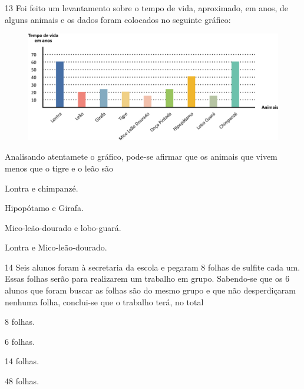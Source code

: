 \pagebreak
\num{13} Foi feito um levantamento sobre o tempo de vida, aproximado, em anos, de alguns animais e os dados foram colocados no seguinte gráfico:

\begin{figure}[htpb!]
\centering
\includegraphics[width=\textwidth]{./media/image112.png}
\end{figure}

Analisando atentamete o gráfico, pode-se afirmar que os animais que vivem menos que o tigre e o leão são

\begin{multicols}{2}[\setlength{\columnsep}{-1cm}]
\begin{escolha}
\item
  Lontra e chimpanzé.
\item
  Hipopótamo e Girafa.
\item
  Mico-leão-dourado e lobo-guará.
\item
  Lontra e Mico-leão-dourado.
\end{escolha}
\end{multicols}


\num{14} Seis alunos foram à secretaria da escola e pegaram 8 folhas de sulfite cada um. Essas folhas serão para realizarem um trabalho em grupo. Sabendo-se que os 6 alunos que foram buscar as folhas são do mesmo grupo
e que não desperdiçaram nenhuma folha, conclui-se que o trabalho terá, no total

\begin{multicols}{2}
\begin{escolha}
\item
  8 folhas.
\item
  6 folhas.
\item
  14 folhas.
\item
  48 folhas.
\end{escolha}
\end{multicols}

\pagebreak

